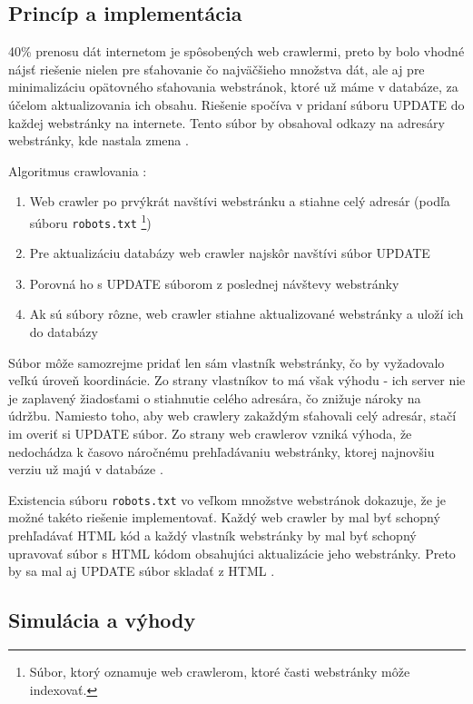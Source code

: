 \documentclass[10pt,twoside,slovak,a4paper]{article}
\begin{document}
\subsection{Princíp a implementácia}

40\% prenosu dát internetom je spôsobených web crawlermi, preto by bolo vhodné nájsť riešenie nielen pre sťahovanie čo najväčšieho množstva dát, ale aj pre minimalizáciu opätovného sťahovania webstránok, ktoré už máme v databáze, za účelom aktualizovania ich obsahu. Riešenie spočíva v pridaní súboru UPDATE do každej webstránky na internete. Tento súbor by obsahoval odkazy na adresáry webstránky, kde nastala zmena \cite{mishra2010smart}.

Algoritmus crawlovania \cite{mishra2010smart}:

\begin{enumerate}
    \item Web crawler po prvýkrát navštívi webstránku a stiahne celý adresár (podľa súboru \texttt{robots.txt} \footnote{Súbor, ktorý oznamuje web crawlerom, ktoré časti webstránky môže indexovať.})
    \item Pre aktualizáciu databázy web crawler najskôr navštívi súbor UPDATE
    \item Porovná ho s UPDATE súborom z poslednej návštevy webstránky
    \item Ak sú súbory rôzne, web crawler stiahne aktualizované webstránky a uloží ich do databázy
\end{enumerate}

Súbor môže samozrejme pridať len sám vlastník webstránky, čo by vyžadovalo veľkú úroveň koordinácie. Zo strany vlastníkov to má však výhodu - ich server nie je zaplavený žiadosťami o stiahnutie celého adresára, čo znižuje nároky na údržbu. Namiesto toho, aby web crawlery zakaždým sťahovali celý adresár, stačí im overiť si UPDATE súbor. Zo strany web crawlerov vzniká výhoda, že nedochádza k časovo náročnému prehľadávaniu webstránky, ktorej najnovšiu verziu už majú v databáze \cite{mishra2010smart}.

Existencia súboru \texttt{robots.txt} vo veľkom množstve webstránok dokazuje, že je možné takéto riešenie implementovať. Každý web crawler by mal byť schopný prehľadávať HTML kód a každý vlastník webstránky by mal byť schopný upravovať súbor s HTML kódom obsahujúci aktualizácie jeho webstránky. Preto by sa mal aj UPDATE súbor skladať z HTML \cite{mishra2010smart}. 

\subsection{Simulácia a výhody}
\end{document}

